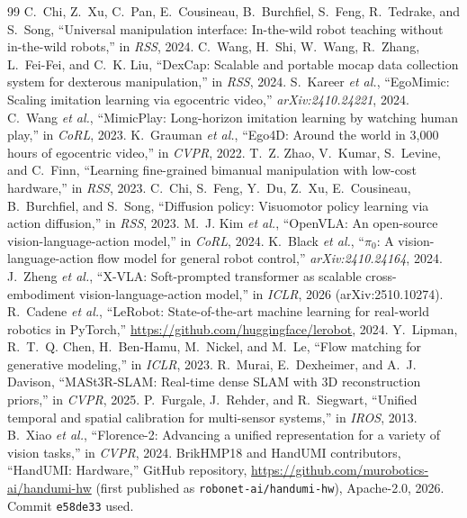 \documentclass[conference,10pt]{IEEEtran}
\begin{document}
\begin{thebibliography}{99}\footnotesize
{} C.~Chi, Z.~Xu, C.~Pan, E.~Cousineau, B.~Burchfiel, S.~Feng, R.~Tedrake, and S.~Song, ``Universal manipulation interface: In-the-wild robot teaching without in-the-wild robots,'' in \emph{RSS}, 2024.
 C.~Wang, H.~Shi, W.~Wang, R.~Zhang, L.~Fei-Fei, and C.~K. Liu, ``DexCap: Scalable and portable mocap data collection system for dexterous manipulation,'' in \emph{RSS}, 2024.
 S.~Kareer \emph{et al.}, ``EgoMimic: Scaling imitation learning via egocentric video,'' \emph{arXiv:2410.24221}, 2024.
 C.~Wang \emph{et al.}, ``MimicPlay: Long-horizon imitation learning by watching human play,'' in \emph{CoRL}, 2023.
 K.~Grauman \emph{et al.}, ``Ego4D: Around the world in 3,000 hours of egocentric video,'' in \emph{CVPR}, 2022.
 T.~Z. Zhao, V.~Kumar, S.~Levine, and C.~Finn, ``Learning fine-grained bimanual manipulation with low-cost hardware,'' in \emph{RSS}, 2023.
 C.~Chi, S.~Feng, Y.~Du, Z.~Xu, E.~Cousineau, B.~Burchfiel, and S.~Song, ``Diffusion policy: Visuomotor policy learning via action diffusion,'' in \emph{RSS}, 2023.
 M.~J. Kim \emph{et al.}, ``OpenVLA: An open-source vision-language-action model,'' in \emph{CoRL}, 2024.
 K.~Black \emph{et al.}, ``$\pi_0$: A vision-language-action flow model for general robot control,'' \emph{arXiv:2410.24164}, 2024.
 J.~Zheng \emph{et al.}, ``X-VLA: Soft-prompted transformer as scalable cross-embodiment vision-language-action model,'' in \emph{ICLR}, 2026 (arXiv:2510.10274).
 R.~Cadene \emph{et al.}, ``LeRobot: State-of-the-art machine learning for real-world robotics in PyTorch,'' \url{https://github.com/huggingface/lerobot}, 2024.
 Y.~Lipman, R.~T.~Q. Chen, H.~Ben-Hamu, M.~Nickel, and M.~Le, ``Flow matching for generative modeling,'' in \emph{ICLR}, 2023.
 R.~Murai, E.~Dexheimer, and A.~J. Davison, ``MASt3R-SLAM: Real-time dense SLAM with 3D reconstruction priors,'' in \emph{CVPR}, 2025.
 P.~Furgale, J.~Rehder, and R.~Siegwart, ``Unified temporal and spatial calibration for multi-sensor systems,'' in \emph{IROS}, 2013.
 B.~Xiao \emph{et al.}, ``Florence-2: Advancing a unified representation for a variety of vision tasks,'' in \emph{CVPR}, 2024.
 BrikHMP18 and HandUMI contributors, ``HandUMI: Hardware,'' GitHub repository, \url{https://github.com/murobotics-ai/handumi-hw} (first published as \texttt{robonet-ai/handumi-hw}), Apache-2.0, 2026. Commit \texttt{e58de33} used.

\end{thebibliography}
\end{document}

